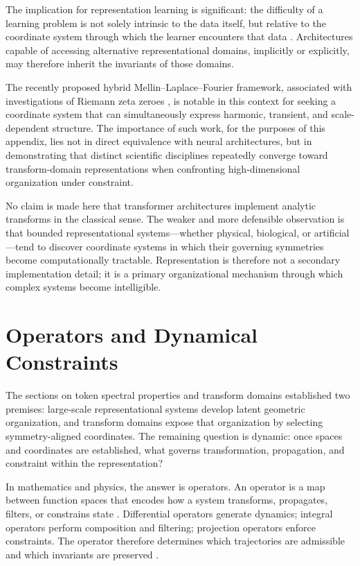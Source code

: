 The implication for representation learning is significant: the difficulty of a learning problem is not solely intrinsic to the data itself, but relative to the coordinate system through which the learner encounters that data \cite{lecun2022path}. Architectures capable of accessing alternative representational domains, implicitly or explicitly, may therefore inherit the invariants of those domains.

The recently proposed hybrid Mellin--Laplace--Fourier framework, associated with investigations of Riemann zeta zeroes \cite{irwin2026mlf}, is notable in this context for seeking a coordinate system that can simultaneously express harmonic, transient, and scale-dependent structure. The importance of such work, for the purposes of this appendix, lies not in direct equivalence with neural architectures, but in demonstrating that distinct scientific disciplines repeatedly converge toward transform-domain representations when confronting high-dimensional organization under constraint.

No claim is made here that transformer architectures implement analytic transforms in the classical sense. The weaker and more defensible observation is that bounded representational systems—whether physical, biological, or artificial—tend to discover coordinate systems in which their governing symmetries become computationally tractable. Representation is therefore not a secondary implementation detail; it is a primary organizational mechanism through which complex systems become intelligible.

\clearpage
{}
\hypertarget{sec:operators_dynamics}{}
\section{Operators and Dynamical Constraints}

The sections on token spectral properties and transform domains established two premises: large-scale representational systems develop latent geometric organization, and transform domains expose that organization by selecting symmetry-aligned coordinates. The remaining question is dynamic: once spaces and coordinates are established, what governs transformation, propagation, and constraint within the representation?

In mathematics and physics, the answer is operators. An operator is a map between function spaces that encodes how a system transforms, propagates, filters, or constrains state \cite{reed1980methods}. Differential operators generate dynamics; integral operators perform composition and filtering; projection operators enforce constraints. The operator therefore determines which trajectories are admissible and which invariants are preserved \cite{lax2002functional}.

